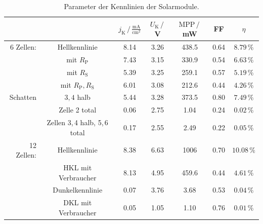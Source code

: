\documentclass[german, parskip=full]{scrartcl}
\newcommand{\tecxt}{}
\begin{document}
\begin{table}[h!]
\centering
\begin{tabular}{r|c|c|c|c|c|c}
&&$j_\tecxt\text{K}\,/\,\frac{\tecxt\text{mA}}{\tecxt\text{cm}^2}$&$U_\tecxt\text{K}\,/\,$V&$\tecxt\text{MPP}\,/\,$mW&FF&$\eta$\\ \hline
6 Zellen:&Hellkennlinie&8.14&3.26&438.5&0.64&$8.79\,\%$\\ \hline
&mit $R_\tecxt\text{P}$&7.43&3.15&330.9&0.54&$6.63\,\%$\\ \hline
&mit $R_\tecxt\text{S}$&5.39&3.25&259.1&0.57&$5.19\,\%$\\ \hline
&mit $R_\tecxt\text{P}, R_\tecxt\text{S}$&6.01&3.08&212.6&0.44&$4.26\,\%$\\ \hline
Schatten&$3,4$ halb&5.44&3.28&373.5&0.80&$7.49\,\%$\\ \hline
&Zelle 2 total&0.06&2.75&1.04&0.24&$0.02\,\%$\\ \hline
&Zellen 3,\,4 halb, 5,\,6 total&0.17&2.55&2.49&0.22&$0.05\,\%$\\ \hline
12 Zellen:&Hellkennlinie&8.38&6.63&1006&0.70&$10.08\,\%$\\ \hline
&HKL mit Verbraucher&8.13&4.95&459.6&0.44&$4.61\,\%$\\ \hline
&Dunkelkennlinie&0.07&3.76&3.68&0.53&$0.04\,\%$\\ \hline
&DKL mit Verbraucher&0.05&1.05&1.10&0.76&$0.01\,\%$\\ \hline
\end{tabular}
\caption{Parameter der Kennlinien der Solarmodule.}
\label{table:KL Parameter C}
\end{table}
\end{document}
